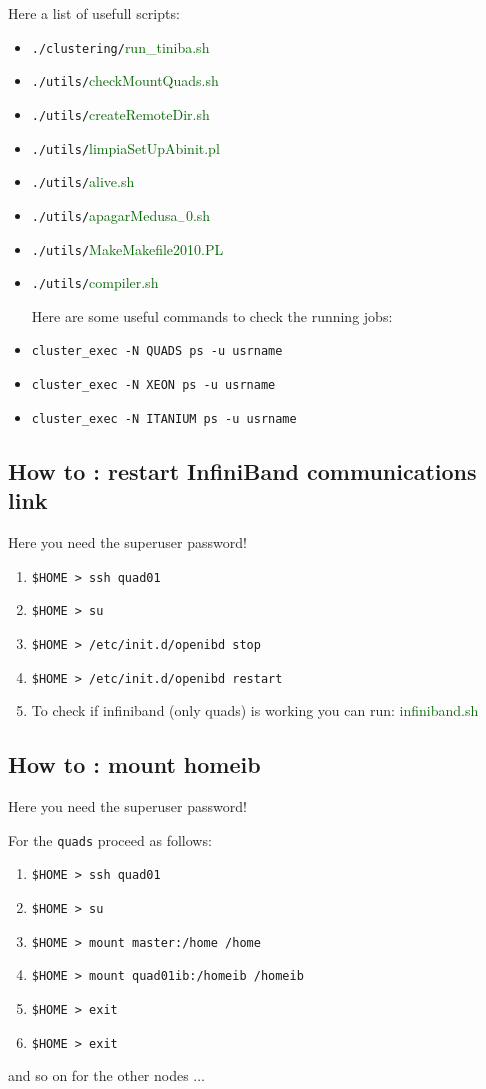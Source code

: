 \documentclass[openany,oneside]{book}
\numberwithin{equation}{section}
\begin{document}
Here a list of usefull scripts:
\begin{itemize}
\item \verb=./clustering/=\textcolor{darkgreen}{run\_tiniba.sh}
\item \verb=./utils/=\textcolor{darkgreen}{checkMountQuads.sh}
\item \verb=./utils/=\textcolor{darkgreen}{createRemoteDir.sh}
\item \verb=./utils/=\textcolor{darkgreen}{limpiaSetUpAbinit.pl}
\item \verb=./utils/=\textcolor{darkgreen}{alive.sh}
\item \verb=./utils/=\textcolor{darkgreen}{apagarMedusa$_{-}0$.sh}
\item \verb=./utils/=\textcolor{darkgreen}{MakeMakefile2010.PL}
\item \verb=./utils/=\textcolor{darkgreen}{compiler.sh}

Here are some useful commands to check the running jobs:
\item \verb=cluster_exec -N QUADS ps -u usrname=
\item \verb=cluster_exec -N XEON ps -u usrname=
\item \verb=cluster_exec -N ITANIUM ps -u usrname=
\end{itemize} 
\subsection{How to : restart InfiniBand communications link }
Here you need the superuser password! 
\begin{enumerate}
\item \verb=$HOME > ssh quad01=  
\item \verb=$HOME > su=
\item \verb=$HOME > /etc/init.d/openibd stop=
\item \verb=$HOME > /etc/init.d/openibd restart=
\item To check if infiniband (only quads) is working you can run:
\textcolor{darkgreen}{infiniband.sh}
\end{enumerate}
\subsection{How to : mount  homeib}
Here you need the superuser password!  

For the \verb=quads= proceed as follows:
\begin{enumerate}
\item \verb=$HOME > ssh quad01=  
\item \verb=$HOME > su=
\item \verb=$HOME > mount master:/home /home=
\item \verb=$HOME > mount quad01ib:/homeib /homeib=
\item \verb=$HOME > exit=
\item \verb=$HOME > exit=
\end{enumerate}
and so on for the other nodes $\ldots$
\end{document}
